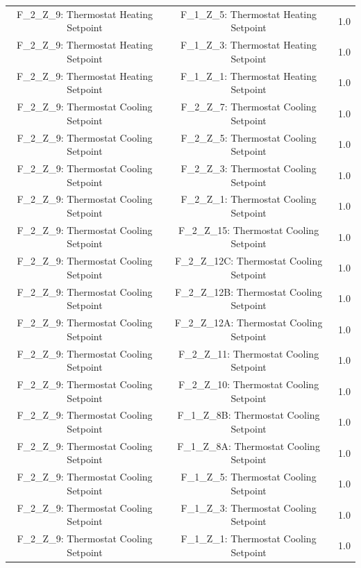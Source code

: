 \documentclass[aps, 10pt, a4paper]{article}
\begin{document}
\begin{longtable}{c|c||c}
                    F\_2\_Z\_9: Thermostat Heating Setpoint & F\_1\_Z\_5: Thermostat Heating Setpoint & 1.0 \\
                    F\_2\_Z\_9: Thermostat Heating Setpoint & F\_1\_Z\_3: Thermostat Heating Setpoint & 1.0 \\
                    F\_2\_Z\_9: Thermostat Heating Setpoint & F\_1\_Z\_1: Thermostat Heating Setpoint & 1.0 \\
                    F\_2\_Z\_9: Thermostat Cooling Setpoint & F\_2\_Z\_7: Thermostat Cooling Setpoint & 1.0 \\
                    F\_2\_Z\_9: Thermostat Cooling Setpoint & F\_2\_Z\_5: Thermostat Cooling Setpoint & 1.0 \\
                    F\_2\_Z\_9: Thermostat Cooling Setpoint & F\_2\_Z\_3: Thermostat Cooling Setpoint & 1.0 \\
                    F\_2\_Z\_9: Thermostat Cooling Setpoint & F\_2\_Z\_1: Thermostat Cooling Setpoint & 1.0 \\
                    F\_2\_Z\_9: Thermostat Cooling Setpoint & F\_2\_Z\_15: Thermostat Cooling Setpoint & 1.0 \\
                    F\_2\_Z\_9: Thermostat Cooling Setpoint & F\_2\_Z\_12C: Thermostat Cooling Setpoint & 1.0 \\
                    F\_2\_Z\_9: Thermostat Cooling Setpoint & F\_2\_Z\_12B: Thermostat Cooling Setpoint & 1.0 \\
                    F\_2\_Z\_9: Thermostat Cooling Setpoint & F\_2\_Z\_12A: Thermostat Cooling Setpoint & 1.0 \\
                    F\_2\_Z\_9: Thermostat Cooling Setpoint & F\_2\_Z\_11: Thermostat Cooling Setpoint & 1.0 \\
                    F\_2\_Z\_9: Thermostat Cooling Setpoint & F\_2\_Z\_10: Thermostat Cooling Setpoint & 1.0 \\
                    F\_2\_Z\_9: Thermostat Cooling Setpoint & F\_1\_Z\_8B: Thermostat Cooling Setpoint & 1.0 \\
                    F\_2\_Z\_9: Thermostat Cooling Setpoint & F\_1\_Z\_8A: Thermostat Cooling Setpoint & 1.0 \\
                    F\_2\_Z\_9: Thermostat Cooling Setpoint & F\_1\_Z\_5: Thermostat Cooling Setpoint & 1.0 \\
                    F\_2\_Z\_9: Thermostat Cooling Setpoint & F\_1\_Z\_3: Thermostat Cooling Setpoint & 1.0 \\
                    F\_2\_Z\_9: Thermostat Cooling Setpoint & F\_1\_Z\_1: Thermostat Cooling Setpoint & 1.0 \\

\end{longtable}
\end{document}
